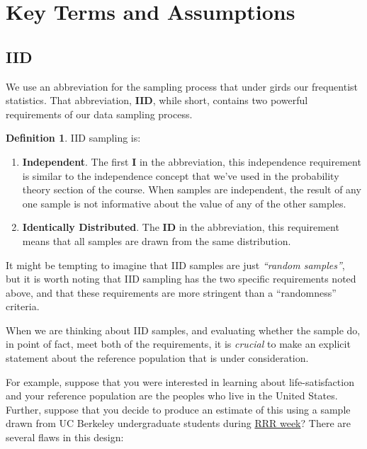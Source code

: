 \documentclass[
]{book}
\providecommand{\tightlist}{%
  \setlength{\itemsep}{0pt}\setlength{\parskip}{0pt}}
\theoremstyle{definition}
\newtheorem{definition}{Definition}[chapter]
\theoremstyle{definition}
\theoremstyle{definition}
\theoremstyle{definition}
\theoremstyle{remark}
\begin{document}
\hypertarget{key-terms-and-assumptions}{%
\section{Key Terms and Assumptions}\label{key-terms-and-assumptions}}

\hypertarget{iid}{%
\subsection{IID}\label{iid}}

We use an abbreviation for the sampling process that under girds our frequentist statistics. That abbreviation, \textbf{IID}, while short, contains two powerful requirements of our data sampling process.

\begin{definition}

IID sampling is:

\begin{enumerate}
\def\labelenumi{\arabic{enumi}.}
\tightlist
\item
  \textbf{Independent}. The first \textbf{I} in the abbreviation, this independence requirement is similar to the independence concept that we've used in the probability theory section of the course. When samples are independent, the result of any one sample is not informative about the value of any of the other samples.
\item
  \textbf{Identically Distributed}. The \textbf{ID} in the abbreviation, this requirement means that all samples are drawn from the same distribution.
\end{enumerate}

\end{definition}

It might be tempting to imagine that IID samples are just \emph{``random samples''}, but it is worth noting that IID sampling has the two specific requirements noted above, and that these requirements are more stringent than a ``randomness'' criteria.

When we are thinking about IID samples, and evaluating whether the sample do, in point of fact, meet both of the requirements, it is \emph{crucial} to make an explicit statement about the reference population that is under consideration.

For example, suppose that you were interested in learning about life-satisfaction and your reference population are the peoples who live in the United States. Further, suppose that you decide to produce an estimate of this using a sample drawn from UC Berkeley undergraduate students during \href{https://teaching.berkeley.edu/sites/default/files/rrr_guidelines.pdf}{RRR week}? There are several flaws in this design:
\end{document}
